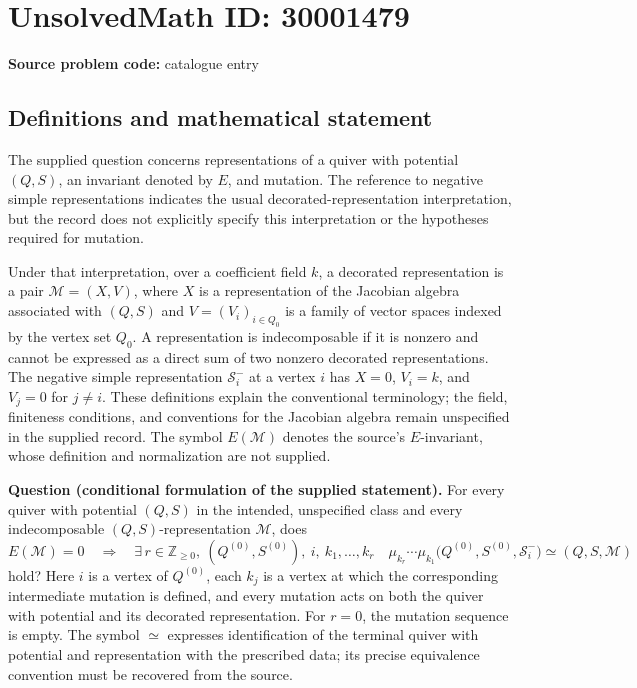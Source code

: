\documentclass[11pt]{article}
\newcommand{\Z}{\mathbb{Z}}
\begin{document}
\section*{UnsolvedMath ID: 30001479}
\textbf{Source problem code:} catalogue entry
\subsection{Definitions and mathematical statement}
The supplied question concerns representations of a quiver with potential \((Q,S)\), an invariant denoted by \(E\), and mutation. The reference to negative simple representations indicates the usual decorated-representation interpretation, but the record does not explicitly specify this interpretation or the hypotheses required for mutation.

Under that interpretation, over a coefficient field \(k\), a decorated representation is a pair \(\mathcal M=(X,V)\), where \(X\) is a representation of the Jacobian algebra associated with \((Q,S)\) and \(V=(V_i)_{i\in Q_0}\) is a family of vector spaces indexed by the vertex set \(Q_0\). A representation is indecomposable if it is nonzero and cannot be expressed as a direct sum of two nonzero decorated representations. The negative simple representation \(\mathcal S_i^-\) at a vertex \(i\) has \(X=0\), \(V_i=k\), and \(V_j=0\) for \(j\ne i\). These definitions explain the conventional terminology; the field, finiteness conditions, and conventions for the Jacobian algebra remain unspecified in the supplied record. The symbol \(E(\mathcal M)\) denotes the source's \(E\)-invariant, whose definition and normalization are not supplied.

\textbf{Question (conditional formulation of the supplied statement).} For every quiver with potential \((Q,S)\) in the intended, unspecified class and every indecomposable \((Q,S)\)-representation \(\mathcal M\), does
\[
E(\mathcal M)=0
\quad\Longrightarrow\quad
\exists\,r\in\Z_{\geq 0},\ (Q^{(0)},S^{(0)}),\ i,\ k_1,\ldots,k_r
\quad
\mu_{k_r}\cdots\mu_{k_1}
\bigl(Q^{(0)},S^{(0)},\mathcal S_i^-\bigr)
\simeq (Q,S,\mathcal M)
\]
hold? Here \(i\) is a vertex of \(Q^{(0)}\), each \(k_j\) is a vertex at which the corresponding intermediate mutation is defined, and every mutation acts on both the quiver with potential and its decorated representation. For \(r=0\), the mutation sequence is empty. The symbol \(\simeq\) expresses identification of the terminal quiver with potential and representation with the prescribed data; its precise equivalence convention must be recovered from the source.
\end{document}
